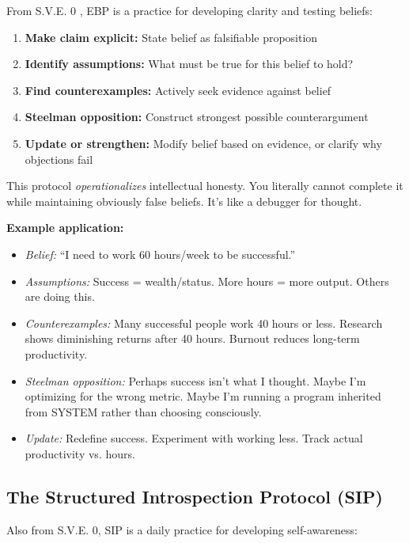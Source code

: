 \documentclass[11pt,a4paper]{article}
\theoremstyle{definition}
\theoremstyle{remark}
\begin{document}
From S.V.E. 0 \citep{sve0}, EBP is a practice for developing clarity and testing beliefs:

\begin{enumerate}
    \item \textbf{Make claim explicit:} State belief as falsifiable proposition
    \item \textbf{Identify assumptions:} What must be true for this belief to hold?
    \item \textbf{Find counterexamples:} Actively seek evidence against belief
    \item \textbf{Steelman opposition:} Construct strongest possible counterargument
    \item \textbf{Update or strengthen:} Modify belief based on evidence, or clarify why objections fail
\end{enumerate}

This protocol \textit{operationalizes} intellectual honesty. You literally cannot complete it while maintaining obviously false beliefs. It's like a debugger for thought.

\textbf{Example application:}
\begin{itemize}
    \item \textit{Belief:} ``I need to work 60 hours/week to be successful.''
    \item \textit{Assumptions:} Success = wealth/status. More hours = more output. Others are doing this.
    \item \textit{Counterexamples:} Many successful people work 40 hours or less. Research shows diminishing returns after 40 hours. Burnout reduces long-term productivity.
    \item \textit{Steelman opposition:} Perhaps success isn't what I thought. Maybe I'm optimizing for the wrong metric. Maybe I'm running a program inherited from SYSTEM rather than choosing consciously.
    \item \textit{Update:} Redefine success. Experiment with working less. Track actual productivity vs. hours.
\end{itemize}

\subsection{The Structured Introspection Protocol (SIP)}

Also from S.V.E. 0, SIP is a daily practice for developing self-awareness:
\end{document}
